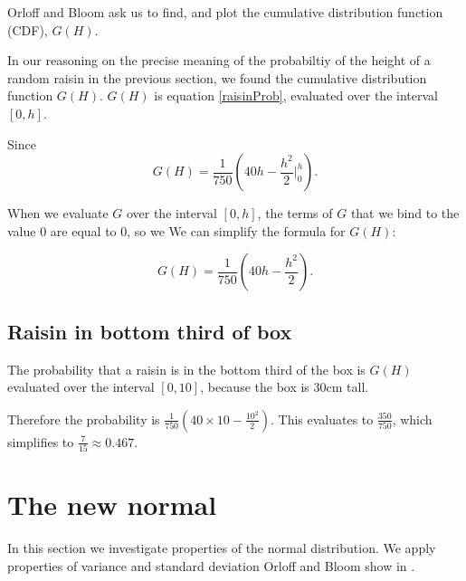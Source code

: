 \documentclass[a4paper,11pt]{article}
\begin{document}
Orloff and Bloom ask us to find, and plot the cumulative distribution function
(CDF), $G \left( H \right)$.

In our reasoning on the precise meaning of the probabiltiy of the height of
a random raisin in the previous section, we found the cumulative distribution
function $G \left( H \right)$. $G \left( H \right)$ is equation
\ref{raisinProb}, evaluated over the interval $\left[0, h \right]$.

Since
\begin{equation}
	G\left( H \right)
 = \frac{1}{750} \left( 40h - \frac{h^{2}}{2} \bigg\rvert_{0}^{h} \right).
\end{equation}

When we evaluate $G$ over the interval $\left[ 0, h \right]$, the terms of $G$
that we bind to the value $0$ are equal to 0, so we We can simplify the formula
for $G \left( H \right)$:

\begin{equation}
	G\left( H \right)
 = \frac{1}{750} \left( 40h - \frac{h^{2}}{2}  \right).
\end{equation}


\begin{center}
\end{center}

\subsection{Raisin in bottom third of box}

The probability that a raisin is in the bottom third of the box is $G(H)$
evaluated over the interval $\left[ 0, 10 \right]$, because the box is $30$cm
tall.

Therefore the probability is
$\frac{1}{750} \left( 40 \times 10 - \frac{10^{2}}{2}  \right)$. This
evaluates to $\frac{350}{750}$, which simplifies to
$\frac{7}{15} \approx 0.467$.

\section{The new normal}
In this section we investigate properties of the normal distribution.  We
apply properties of variance and standard deviation Orloff and Bloom
show in \cite{reading5b}.
\end{document}
